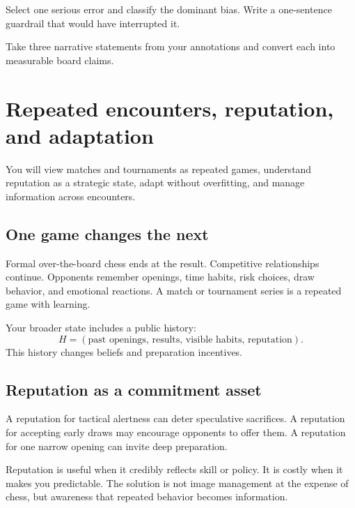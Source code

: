\begin{exercise}
Select one serious error and classify the dominant bias. Write a one-sentence guardrail that would have interrupted it.
\end{exercise}

\begin{exercise}
Take three narrative statements from your annotations and convert each into measurable board claims.
\end{exercise}


\chapter{Repeated encounters, reputation, and adaptation}
\begin{learningbox}
You will view matches and tournaments as repeated games, understand reputation as a strategic state, adapt without overfitting, and manage information across encounters.
\end{learningbox}

\section{One game changes the next}
Formal over-the-board chess ends at the result. Competitive relationships continue. Opponents remember openings, time habits, risk choices, draw behavior, and emotional reactions. A match or tournament series is a repeated game with learning.

Your broader state includes a public history:
\[
H=(\text{past openings, results, visible habits, reputation}).
\]
This history changes beliefs and preparation incentives.

\section{Reputation as a commitment asset}
A reputation for tactical alertness can deter speculative sacrifices. A reputation for accepting early draws may encourage opponents to offer them. A reputation for one narrow opening can invite deep preparation.

Reputation is useful when it credibly reflects skill or policy. It is costly when it makes you predictable. The solution is not image management at the expense of chess, but awareness that repeated behavior becomes information.


